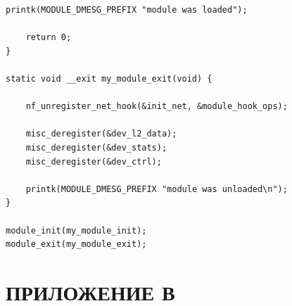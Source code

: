 \documentclass{bmstu}
\begin{document}
\begin{lstlisting}[caption = {core\_module.c}]
    printk(MODULE_DMESG_PREFIX "module was loaded");

    return 0;
}

static void __exit my_module_exit(void) {

    nf_unregister_net_hook(&init_net, &module_hook_ops);

    misc_deregister(&dev_l2_data);
    misc_deregister(&dev_stats);
    misc_deregister(&dev_ctrl);

    printk(MODULE_DMESG_PREFIX "module was unloaded\n");
}

module_init(my_module_init);
module_exit(my_module_exit);
\end{lstlisting}

\chapter*{ПРИЛОЖЕНИЕ В}
\end{document}
